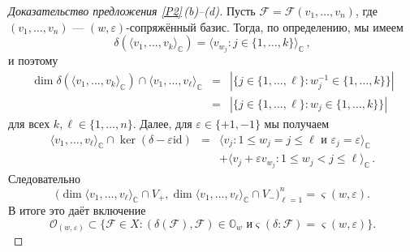 \documentclass{amsart}
\theoremstyle{definition}
\begin{document}
\begin{proof}[Доказательство предложения \ref{P2}\,{\rm (b)}--{\rm (d)}]
Пусть $\mathcal{F}=\mathcal{F}(v_1,\ldots,v_n)$, где
$(v_1,\ldots,v_n)$ --- $(w,\varepsilon)$-сопряжённый базис. Тогда, по определению, мы имеем
\[\delta(\langle v_1,\ldots,v_k\rangle_\mathbb{C})=\langle v_{w_j}:j\in\{1,\ldots,k\}\rangle_\mathbb{C}\,,\]
и поэтому \begin{eqnarray*} \dim \delta(\langle
v_1,\ldots,v_k\rangle_\mathbb{C})\cap \langle v_1,\ldots,v_\ell\rangle_\mathbb{C} & = &
|\{j\in\{1,\ldots,\ell\}:w^{-1}_j\in\{1,\ldots,k\}\}| \\
  & = &
|\{j\in\{1,\ldots,\ell\}:w_j\in\{1,\ldots,k\}\}|
\end{eqnarray*}
для всех $k,\ell\in\{1,\ldots,n\}$. Далее, для
$\varepsilon\in\{+1,-1\}$ мы получаем
\begin{eqnarray*}
\langle
v_1,\ldots,v_\ell\rangle_\mathbb{C}\cap\ker(\delta-\varepsilon\mathrm{id}) & =
&
\langle v_j:1\leq w_j=j\leq \ell\mbox{ и }\varepsilon_j=\varepsilon\rangle_\mathbb{C} \\
 & & +\langle
v_j+\varepsilon v_{w_j}:1\leq w_j<j\leq \ell\rangle_\mathbb{C}\,.
\end{eqnarray*}
Следовательно
\[
\big(\dim \langle
v_1,\ldots,v_\ell\rangle_\mathbb{C}\cap V_+,\dim \langle
v_1,\ldots,v_\ell\rangle_\mathbb{C}\cap V_-\big)_{\ell=1}^n=\varsigma(w,\varepsilon).
\]
В итоге это даёт включение
\begin{equation}
\label{3} \mathcal{O}_{(w,\varepsilon)}\subset\big\{\mathcal{F}\in
X: (\delta(\mathcal{F}),\mathcal{F})\in\mathbb{O}_{w}\mbox{ и
}\varsigma(\delta:\mathcal{F})=\varsigma(w,\varepsilon)\big\}.
\end{equation}


\end{proof}
\end{document}
